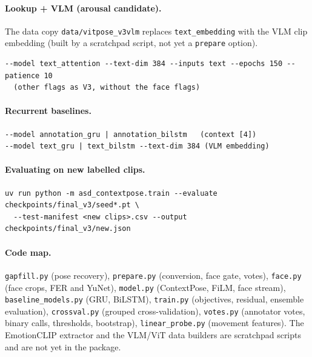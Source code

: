 \documentclass[11pt]{article}
\newcommand{\code}[1]{\texttt{#1}}
\begin{document}
\paragraph{Lookup + VLM (arousal candidate).} The data copy \code{data/vitpose\_v3vlm} replaces \code{text\_embedding} with the VLM clip embedding (built by a scratchpad script, not yet a \code{prepare} option).
\begin{verbatim}
--model text_attention --text-dim 384 --inputs text --epochs 150 --patience 10
  (other flags as V3, without the face flags)
\end{verbatim}

\paragraph{Recurrent baselines.}
\begin{verbatim}
--model annotation_gru | annotation_bilstm   (context [4])
--model text_gru | text_bilstm --text-dim 384 (VLM embedding)
\end{verbatim}

\paragraph{Evaluating on new labelled clips.}
\begin{verbatim}
uv run python -m asd_contextpose.train --evaluate checkpoints/final_v3/seed*.pt \
  --test-manifest <new clips>.csv --output checkpoints/final_v3/new.json
\end{verbatim}

\paragraph{Code map.} \code{gapfill.py} (pose recovery), \code{prepare.py} (conversion, face gate, votes), \code{face.py} (face crops, FER and YuNet), \code{model.py} (ContextPose, FiLM, face stream), \code{baseline\_models.py} (GRU, BiLSTM), \code{train.py} (objectives, residual, ensemble evaluation), \code{crossval.py} (grouped cross-validation), \code{votes.py} (annotator votes, binary calls, thresholds, bootstrap), \code{linear\_probe.py} (movement features). The EmotionCLIP extractor and the VLM/ViT data builders are scratchpad scripts and are not yet in the package.
\end{document}

